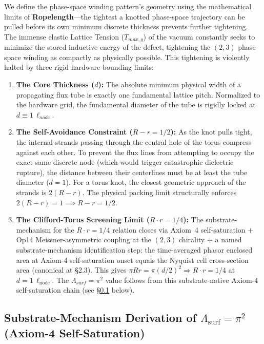 We define the phase-space winding pattern's geometry using the mathematical limits of \textbf{Ropelength}---the tightest a knotted phase-space trajectory can be pulled before its own minimum discrete thickness prevents further tightening. The immense elastic Lattice Tension ($T_{max,g}$) of the vacuum constantly seeks to minimize the stored inductive energy of the defect, tightening the $(2, 3)$ phase-space winding as compactly as physically possible. This tightening is violently halted by three rigid hardware bounding limits:

\begin{enumerate}
    \item \textbf{The Core Thickness ($d$):} The absolute minimum physical width of a propagating flux tube is exactly one fundamental lattice pitch. Normalized to the hardware grid, the fundamental diameter of the tube is rigidly locked at $d \equiv 1 \, \ell_{node}$.

    \item \textbf{The Self-Avoidance Constraint ($R - r = 1/2$):} As the knot pulls tight, the internal strands passing through the central hole of the torus compress against each other. To prevent the flux lines from attempting to occupy the exact same discrete node (which would trigger catastrophic dielectric rupture), the distance between their centerlines must be at least the tube diameter ($d=1$). For a torus knot, the closest geometric approach of the strands is $2(R-r)$. The physical packing limit structurally enforces $2(R-r) = 1 \implies R - r = 1/2$.

    \item \textbf{The Clifford-Torus Screening Limit ($R \cdot r = 1/4$):} The substrate-mechanism for the $R \cdot r = 1/4$ relation closes via Axiom~4 self-saturation $+$ Op14 Meissner-asymmetric coupling at the $(2,3)$ chirality $+$ a named substrate-mechanism identification step: the time-averaged phasor enclosed area at Axiom-4 self-saturation onset equals the Nyquist cell cross-section area (canonical at  \S2.3). This gives $\pi R r = \pi(d/2)^2 \Rightarrow R \cdot r = 1/4$ at $d = 1\,\ell_\text{node}$. The $\Lambda_{surf} = \pi^2$ value follows from this substrate-native Axiom-4 self-saturation chain (see \S\ref{sec:pi_squared_rigor} below).
\end{enumerate}

\subsection{Substrate-Mechanism Derivation of $\Lambda_{\text{surf}} = \pi^2$ (Axiom-4 Self-Saturation)}
\label{sec:pi_squared_rigor}

